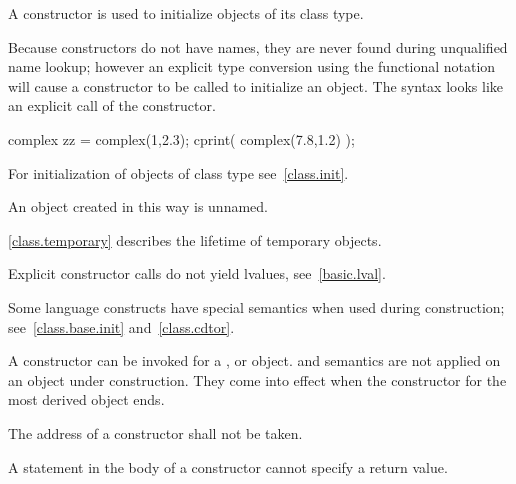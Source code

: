 \pnum
{}%
A constructor is used to initialize objects of its class type.
\begin{note}
Because constructors do not have names, they are never found during
unqualified name lookup; however an explicit type conversion using the functional
notation will cause a constructor to be called to
initialize an object.
The syntax looks like an explicit call of the constructor.
\end{note}
\begin{example}
\begin{codeblock}
complex zz = complex(1,2.3);
cprint( complex(7.8,1.2) );
\end{codeblock}
\end{example}
\begin{note}
For initialization of objects of class type see~\ref{class.init}.
\end{note}

\pnum
{}%
An object created in this way is unnamed.
\begin{note}
\ref{class.temporary} describes the lifetime of temporary objects.
\end{note}
\begin{note}
Explicit constructor calls do not yield lvalues, see~\ref{basic.lval}.
\end{note}

\pnum
\begin{note}
%
Some language constructs have special semantics when used during construction;
see~\ref{class.base.init} and~\ref{class.cdtor}.
\end{note}

\pnum
{}%
%
A constructor can be invoked for a
,
or
object.
%
and
semantics are not applied on an object under construction.
They come into effect when the constructor for the
most derived object ends.

\pnum
{}%
The address of a constructor shall not be taken.
%
\begin{note}
A  statement in the body of a constructor
cannot specify a return value.
\end{note}

